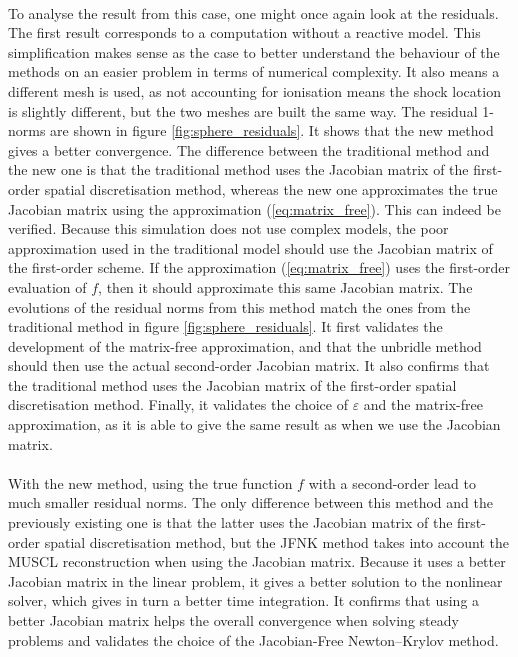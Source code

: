         \paragraph{}
        To analyse the result from this case, one might once again look at the residuals.
        The first result corresponds to a computation without a reactive model.
        This simplification makes sense as the case to better understand the behaviour of the methods on an easier problem in terms of numerical complexity.
        It also means a different mesh is used, as not accounting for ionisation means the shock location is slightly different, but the two meshes are built the same way.
        The residual 1-norms are shown in figure \ref{fig:sphere_residuals}.
        It shows that the new method gives a better convergence.
        The difference between the traditional method and the new one is that the traditional method uses the Jacobian matrix of the first-order spatial discretisation method, whereas the new one approximates the true Jacobian matrix using the approximation (\ref{eq:matrix_free}).
        This can indeed be verified.
        Because this simulation does not use complex models, the poor approximation used in the traditional model should use the Jacobian matrix of the first-order scheme.
        If the approximation (\ref{eq:matrix_free}) uses the first-order evaluation of $f$, then it should approximate this same Jacobian matrix.
        The evolutions of the residual norms from this method match the ones from the traditional method in figure \ref{fig:sphere_residuals}.
        It first validates the development of the matrix-free approximation, and that the unbridle method should then use the actual second-order Jacobian matrix.
        It also confirms that the traditional method uses the Jacobian matrix of the first-order spatial discretisation method.
        Finally, it validates the choice of $\varepsilon$ and the matrix-free approximation, as it is able to give the same result as when we use the Jacobian matrix.

        \paragraph{}
        With the new method, using the true function $f$ with a second-order lead to much smaller residual norms.
        The only difference between this method and the previously existing one is that the latter uses the Jacobian matrix of the first-order spatial discretisation method, but the JFNK method takes into account the MUSCL reconstruction when using the Jacobian matrix.
        Because it uses a better Jacobian matrix in the linear problem, it gives a better solution to the nonlinear solver, which gives in turn a better time integration.
        It confirms that using a better Jacobian matrix helps the overall convergence when solving steady problems and validates the choice of the Jacobian-Free Newton--Krylov method.

